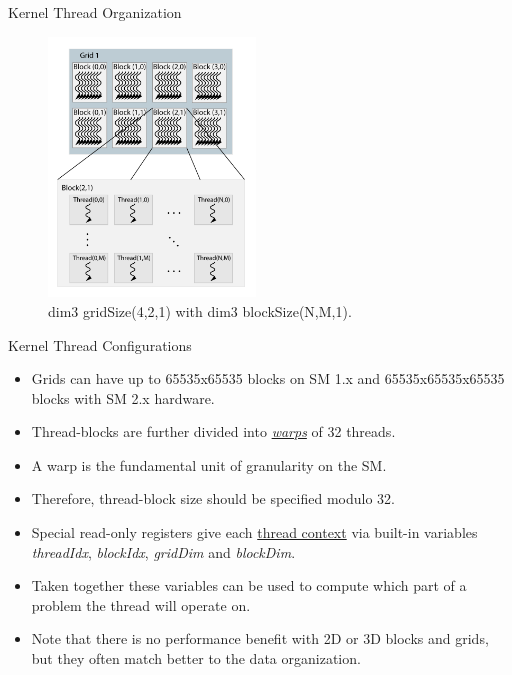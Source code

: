 \documentclass[handout]{beamer}
\begin{document}
\begin{frame}{Kernel Thread Organization}
\centering
\begin{figure}
\label{fig:gridorg}
\includegraphics[width=5.5cm]{../media/grid_org.pdf}
\caption{dim3 gridSize(4,2,1) with dim3 blockSize(N,M,1).}
\end{figure}
\end{frame}

\begin{frame}{Kernel Thread Configurations}
\begin{itemize}
	\item<1->Grids can have up to 65535x65535 blocks on SM 1.x and 65535x65535x65535 blocks with SM 2.x hardware.
	\item<1->Thread-blocks are further divided into \href{http://docs.nvidia.com/cuda/cuda-c-programming-guide/index.html\#simt-architecture}{\color{blue}\emph{warps}} of 32 threads.  
	\item<1->A warp is the fundamental unit of granularity on the SM.
	\item<1->Therefore, thread-block size should be specified modulo 32.
	\item<1->Special read-only registers give each \href{http://docs.nvidia.com/cuda/cuda-c-programming-guide/index.html\#thread-hierarchy}{\color{blue}thread context} via built-in variables \emph{threadIdx}, \emph{blockIdx}, \emph{gridDim} and \emph{blockDim}.
	\item<1->Taken together these variables can be used to compute which part of a problem the thread will operate on.
	\item<1->Note that there is no performance benefit with 2D or 3D blocks and grids, but they often match better to the data organization.
\end{itemize}
\end{frame}
\end{document}
